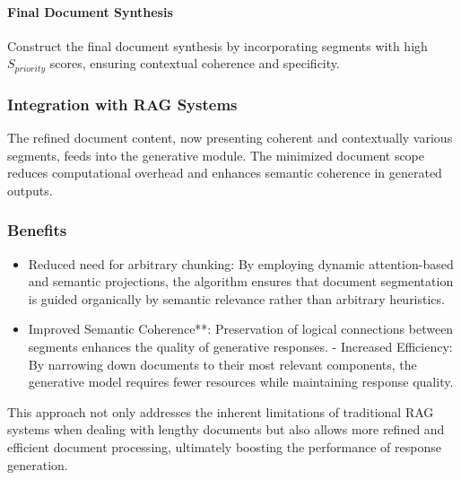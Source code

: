 \documentclass{article}
\theoremstyle{plain}
\theoremstyle{definition}
\theoremstyle{remark}
\begin{document}
\paragraph{Final Document Synthesis}
Construct the final document synthesis by incorporating segments with high $S_{priority}$ scores, ensuring contextual coherence and specificity.

\subsubsection{Integration with RAG Systems}

The refined document content, now presenting coherent and contextually various segments, feeds into the generative module. The minimized document scope reduces computational overhead and enhances semantic coherence in generated outputs.

\subsubsection{Benefits}
\begin{itemize}

\item  Reduced need for arbitrary chunking: By employing dynamic attention-based and semantic projections, the algorithm ensures that document segmentation is guided organically by semantic relevance rather than arbitrary heuristics.
\item  Improved Semantic Coherence**: Preservation of logical connections between segments enhances the quality of generative responses.
- Increased Efficiency: By narrowing down documents to their most relevant components, the generative model requires fewer resources while maintaining response quality.
\end{itemize}

This approach not only addresses the inherent limitations of traditional RAG systems when dealing with lengthy documents but also allows more refined and efficient document processing, ultimately boosting the performance of response generation.
\end{document}
